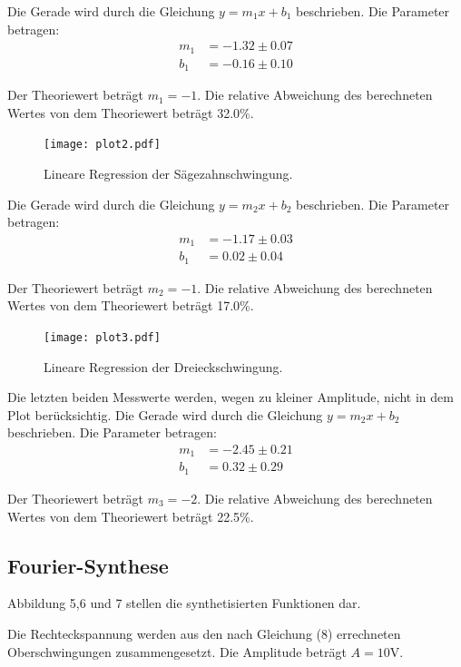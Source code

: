 Die Gerade wird durch die Gleichung $y = m_1x + b_1$ beschrieben. Die Parameter betragen:
\begin{align*}
  m_1 &= -1.32 \pm 0.07 \\
  b_1 &= -0.16 \pm 0.10
\end{align*}

Der Theoriewert beträgt $m_1=-1$. Die relative Abweichung des berechneten Wertes von dem Theoriewert beträgt 32.0\%.

\begin{figure}
  \centering
  \texttt{[image: plot2.pdf]}
  \caption{Lineare Regression der Sägezahnschwingung.}
  \label{fig:saegezahn}
\end{figure}

Die Gerade wird durch die Gleichung $y = m_2x + b_2$ beschrieben. Die Parameter betragen:
\begin{align*}
  m_1 &= -1.17 \pm 0.03 \\
  b_1 &= 0.02 \pm 0.04
\end{align*}

Der Theoriewert beträgt $m_2=-1$. Die relative Abweichung des berechneten Wertes von dem Theoriewert beträgt 17.0\%.

\begin{figure}[H]
  \centering
  \texttt{[image: plot3.pdf]}
  \caption{Lineare Regression der Dreieckschwingung.}
  \label{fig:dreieck}
\end{figure}

Die letzten beiden Messwerte werden, wegen zu kleiner Amplitude, nicht in dem Plot berücksichtig.
Die Gerade wird durch die Gleichung $y = m_2x + b_2$ beschrieben. Die Parameter betragen:
\begin{align*}
  m_1 &= -2.45 \pm 0.21 \\
  b_1 &= 0.32 \pm 0.29
\end{align*}

Der Theoriewert beträgt $m_3=-2$. Die relative Abweichung des berechneten Wertes von dem Theoriewert beträgt 22.5\%.

\subsection{Fourier-Synthese}

Abbildung 5,6 und 7 stellen die synthetisierten Funktionen dar.
\pagebreak

Die Rechteckspannung werden aus den nach Gleichung (8) errechneten Oberschwingungen zusammengesetzt.
Die Amplitude beträgt $A = 10$V.

